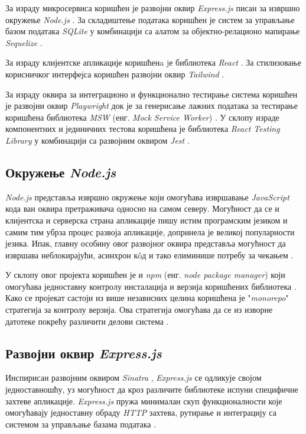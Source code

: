 \documentclass[12pt,oneside]{memoir}
\begin{document}
За израду микросервиса коришћен је развојни оквир \textit{Express.js} \cite{express} писан за извршно окружење \textit{Node.js} \cite{nodejs}. За складиштење података коришћен је систем за управљање базом података \textit{SQLite} \cite{sqlite} у комбинацији са алатом за објектно-релационо мапирање \textit{Sequelize} \cite{sequelize}. 

За израду клијентске апликације коришћенa jе библиотека \textit{React} \cite{react}. За стилизовање корисничког интерфејса коришћен развојни оквир \textit{Tailwind} \cite{tailwind}. 

За израду оквира за интеграционо и функционално тестирање система коришћен је развојни оквир \textit{Playwright} \cite{playwright} док је за генерисање лажних података за тестирање коришћена библиотека \textit{MSW} (енг. \textit{Mock Service Worker}) \cite{msw}. У склопу израде компонентних и јединичних тестова коришћена је библиотека \textit{React Testing Library} \cite{rtl} у комбинацији са развојним оквиром \textit{Jest} \cite{jest}.

\subsection{Окружење \textit{Node.js}}

\textit{Node.js} представља извршно окружење који омогућава извршавање \textit{JavaScript} кода ван оквира претраживача односно на самом северу. Могућност да се и клијентска и серверска страна апликације пишу истим програмским језиком и самим тим убрза процес развоја апликације, допринела је великој популарности језика.
Ипак, главну особину овог развојног оквира представља могућност да извршава неблокирајући, асинхрон к\^{o}д и тако елиминише потребу за чекањем  \cite{w3nodejs}.

У склопу овог пројекта коришћен је и \textit{npm} (енг. \textit{node package manager}) који омогућава једноставну контролу инсталација и верзија коришћених библиотека \cite{npm}. Како се пројекат састоји из више независних целина коришћена је "\textit{monorepo}" стратегија за контролу верзија. Ова стратегија омогућава да се из изворне датотеке покрећу различити делови система \cite{monorepo}.

\subsection{Развојни оквир \textit{Express.js}}

Инспирисан развојним оквиром \textit{Sinatra} \cite{sinatra}, \textit{Express.js} се одликује својом једноставношћу, уз могућност да кроз различите библиотеке испуни специфичне захтеве апликације. \textit{Express.js} пружа минималан скуп функционалности које омогућавају једноставну обраду \textit{HTTP} захтева, рутирање и интеграцију са системом за управљање базама података \cite{express}. 
\end{document}
